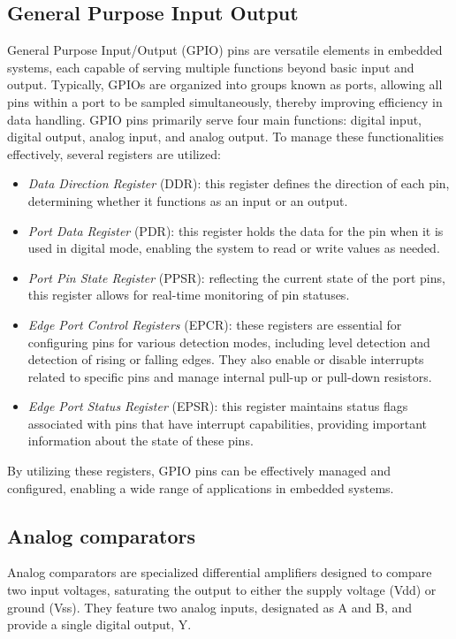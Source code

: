 \subsection{General Purpose Input Output}
General Purpose Input/Output (GPIO) pins are versatile elements in embedded systems, each capable of serving multiple functions beyond basic input and output. 
Typically, GPIOs are organized into groups known as ports, allowing all pins within a port to be sampled simultaneously, thereby improving efficiency in data handling.
GPIO pins primarily serve four main functions: digital input, digital output, analog input, and analog output. 
To manage these functionalities effectively, several registers are utilized:
\begin{itemize}
    \item \textit{Data Direction Register} (DDR): this register defines the direction of each pin, determining whether it functions as an input or an output.
    \item \textit{Port Data Register} (PDR): this register holds the data for the pin when it is used in digital mode, enabling the system to read or write values as needed.
    \item \textit{Port Pin State Register} (PPSR): reflecting the current state of the port pins, this register allows for real-time monitoring of pin statuses.
    \item \textit{Edge Port Control Registers} (EPCR): these registers are essential for configuring pins for various detection modes, including level detection and detection of rising or falling edges. 
        They also enable or disable interrupts related to specific pins and manage internal pull-up or pull-down resistors.
    \item \textit{Edge Port Status Register} (EPSR): this register maintains status flags associated with pins that have interrupt capabilities, providing important information about the state of these pins.
\end{itemize}
By utilizing these registers, GPIO pins can be effectively managed and configured, enabling a wide range of applications in embedded systems.

\subsection{Analog comparators}
Analog comparators are specialized differential amplifiers designed to compare two input voltages, saturating the output to either the supply voltage (Vdd) or ground (Vss). 
They feature two analog inputs, designated as A and B, and provide a single digital output, Y.

